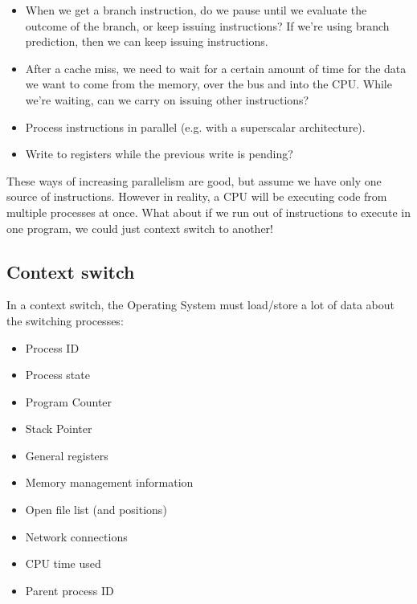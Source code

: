 \begin{itemize}
  \item When we get a branch instruction, do we pause until we evaluate the
  outcome of the branch, or keep issuing instructions? If we're using branch
  prediction, then we can keep issuing instructions.

  \item After a cache miss, we need to wait for a certain amount of time for the
  data we want to come from the memory, over the bus and into the CPU. While
  we're waiting, can we carry on issuing other instructions?

  \item Process instructions in parallel (e.g. with a superscalar architecture).

  \item Write to registers while the previous write is pending?
\end{itemize}

These ways of increasing parallelism are good, but assume we have only one source
of instructions. However in reality, a CPU will be executing code from multiple
processes at once. What about if we run out of instructions to execute in one
program, we could just context switch to another!

\subsection{Context switch}

In a context switch, the Operating System must load/store a lot of data about
the switching processes:

\begin{mymulticols}
  \begin{itemize}
    \item Process ID
    \item Process state
    \item Program Counter
    \item Stack Pointer
    \item General registers
    \item Memory management information
    \item Open file list (and positions)
    \item Network connections
    \item CPU time used
    \item Parent process ID
  \end{itemize}
\end{mymulticols}

